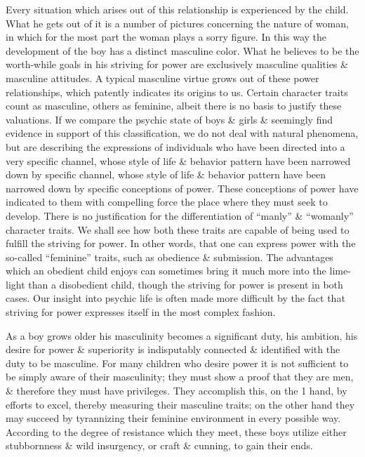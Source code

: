 \documentclass{article}
\begin{document}
Every situation which arises out of this relationship is experienced by the child. What he gets out of it is a number of pictures concerning the nature of woman, in which for the most part the woman plays a sorry figure. In this way the development of the boy has a distinct masculine color. What he believes to be the worth-while goals in his striving for power are exclusively masculine qualities \& masculine attitudes. A typical masculine virtue grows out of these power relationships, which patently indicates its origins to us. Certain character traits count as masculine, others as feminine, albeit there is no basis to justify these valuations. If we compare the psychic state of boys \& girls \& seemingly find evidence in support of this classification, we do not deal with natural phenomena, but are describing the expressions of individuals who have been directed into a very specific channel, whose style of life \& behavior pattern have been narrowed down by specific channel, whose style of life \& behavior pattern have been narrowed down by specific conceptions of power. These conceptions of power have indicated to them with compelling force the place where they must seek to develop. There is no justification for the differentiation of ``manly'' \& ``womanly'' character traits. We shall see how both these traits are capable of being used to fulfill the striving for power. In other words, that one can express power with the so-called ``feminine'' traits, such as obedience \& submission. The advantages which an obedient child enjoys can sometimes bring it much more into the lime-light than a disobedient child, though the striving for power is present in both cases. Our insight into psychic life is often made more difficult by the fact that striving for power expresses itself in the most complex fashion.

As a boy grows older his masculinity becomes a significant duty, his ambition, his desire for power \& superiority is indisputably connected \& identified with the duty to be masculine. For many children who desire power it is not sufficient to be simply aware of their masculinity; they must show a proof that they are men, \& therefore they must have privileges. They accomplish this, on the 1 hand, by efforts to excel, thereby measuring their masculine traits; on the other hand they may succeed by tyrannizing their feminine environment in every possible way. According to the degree of resistance which they meet, these boys utilize either stubbornness \& wild insurgency, or craft \& cunning, to gain their ends.
\end{document}
